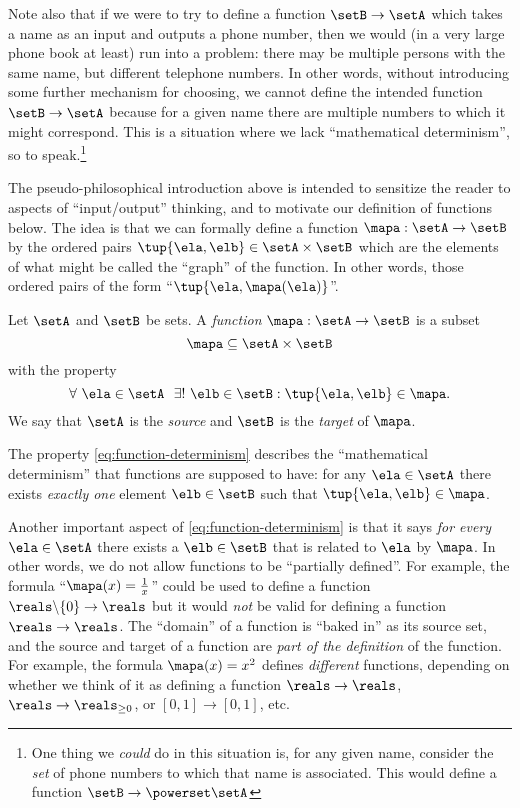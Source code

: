 Note also that if we were to try to define a function $\setB \to \setA$ which takes a name as an input and outputs a phone number, then we would (in a very large phone book at least) run into a problem: there may be multiple persons with the same name, but different telephone numbers. In other words, without introducing some further mechanism for choosing, we cannot define the intended function $\setB \to \setA$ because for a given name there are multiple numbers to which it might correspond. This is a situation where we lack ``mathematical determinism'', so to speak.\footnote{One thing we \emph{could} do in this situation is, for any given name, consider the \emph{set} of phone numbers to which that name is associated. This would define a function $\setB \to \powerset \setA$}

The pseudo-philosophical introduction above is intended to sensitize the reader to aspects of ``input/output'' thinking, and to motivate our definition of functions below. The idea is that we can formally define a function $\mapa: \setA \to \setB$ by the ordered pairs $\tup{\ela, \elb} \in \setA \times \setB$ which are the elements of what might be called the ``graph'' of the function. In other words, those ordered pairs of the form ``$\tup{\ela, \mapa(\ela)}$''.

\begin{definition}
Let $\setA$ and $\setB$ be sets. A \emph{function} $\mapa: \setA \to \setB$ is a subset
\begin{equation}
\mapa \subseteq \setA \times \setB
\end{equation}
with the property 
\begin{equation}\label{eq:function-determinism}
\forall \ \ela \in \setA  \ \  \exists ! \ \elb \in \setB : \tup{\ela,\elb} \in \mapa.
\end{equation}
We say that $\setA$ is the \emph{source} and $\setB$ is the \emph{target} of $\mapa$. 
\end{definition}

The property \cref{eq:function-determinism} describes the ``mathematical determinism'' that functions are supposed to have: for any $\ela \in \setA$ there exists \emph{exactly one} element $\elb \in \setB$ such that $\tup{\ela, \elb} \in \mapa$. 

Another important aspect of \cref{eq:function-determinism} is that it says \emph{for every} $\ela \in \setA$ there exists a $\elb \in \setB$ that is related to $\ela$ by $\mapa$. In other words, we do not allow functions to be ``partially defined''. For example, the formula ``$\mapa(x) = \frac{1}{x}$'' could be used to define a function $\reals \backslash \{ 0 \} \to \reals$ but it would \emph{not} be valid for defining a function $\reals \to \reals$. The ``domain'' of a function is ``baked in'' as its source set, and the source and target of a function are \emph{part of the definition} of the function. For example, the formula $\mapa(x) = x^2$ defines \emph{different} functions, depending on whether we think of it as defining a function $\reals \to \reals$, $\reals \to \reals_{\geq 0}$, or $[0,1] \to [0,1]$, etc. 


